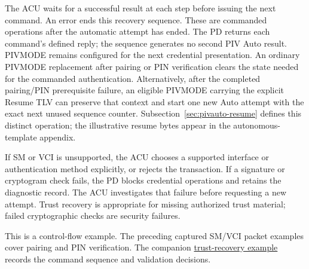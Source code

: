 The ACU waits for a successful result at each step before issuing the next
command. An error ends this recovery sequence. These are commanded operations
after the automatic attempt has ended. The PD
returns each command's defined reply; the sequence generates no second PIV Auto
result. PIVMODE remains configured for the next credential presentation.
An ordinary PIVMODE replacement after pairing or PIN verification clears the state
needed for the commanded authentication. Alternatively, after the completed
pairing/PIN prerequisite failure, an eligible PIVMODE carrying the explicit Resume
TLV can preserve that context and start one new Auto attempt with the exact next
unused sequence counter. Subsection~\ref{sec:pivauto-resume} defines this distinct
operation; the illustrative resume bytes appear in the autonomous-template appendix.

If SM or VCI is unsupported, the ACU chooses a supported interface or
authentication method explicitly, or rejects the transaction. If a signature
or cryptogram check fails, the PD blocks credential operations and retains
the diagnostic record. The ACU investigates that failure before requesting
a new attempt. Trust recovery is appropriate for missing authorized trust
material; failed cryptographic checks are security failures.

This is a control-flow example. The preceding captured SM/VCI packet examples
cover pairing and PIN verification. The companion
\href{run:worked-examples/sm-vci/trust-recovery.md}{trust-recovery example}
records the command sequence and validation decisions.

